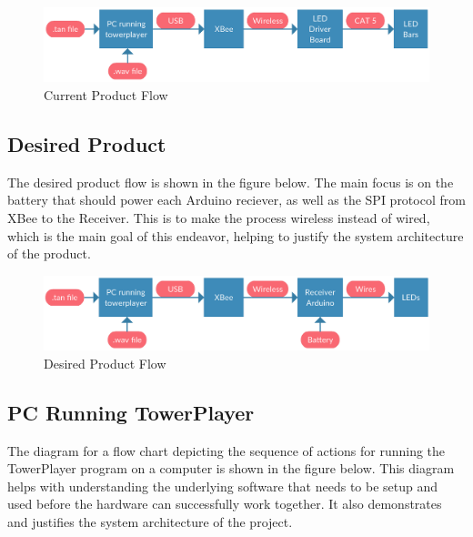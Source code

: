 \documentclass[12pt]{article}
\begin{document}
{{{{			\begin{figure}[ht!]
				\centering
				\includegraphics[width=170mm]{assets/What_We_Have.png}
				\caption{Current Product Flow \label{overflow}}
			\end{figure}
		
		
		\subsection{Desired Product}
			The desired product flow is shown in the figure below. The main focus is on the battery that should power each Arduino reciever, as well as the SPI protocol from XBee to the Receiver. This is to make the process wireless instead of wired, which is the main goal of this endeavor, helping to justify the system architecture of the product.
			
			\begin{figure}[ht!]
				\centering
				\includegraphics[width=170mm]{assets/What_We_Want.png}
				\caption{Desired Product Flow \label{overflow}}
			\end{figure}
		
		
		\subsection{PC Running TowerPlayer}
		The diagram for a flow chart depicting the sequence of actions for running the TowerPlayer program on a computer is shown in the figure below. This diagram helps with understanding the underlying software that needs to be setup and used before the hardware can successfully work together. It also demonstrates and justifies the system architecture of the project.
		
}}}}
\end{document}
